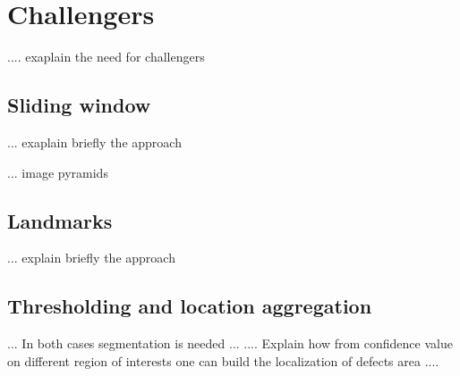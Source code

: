 \section{Challengers}\label{section:challengers}
    \par{
        .... exaplain the need for challengers
    }
    \subsection{Sliding window}
        \par{
            ... exaplain briefly the approach
        }
        \par{
            ... image pyramids
        }

    \subsection{Landmarks}
        \par{
            ... explain briefly the approach
        }

    \subsection{Thresholding and location aggregation}
        \par{
            ... In both cases segmentation is needed ...
            .... Explain how from confidence value on different region of interests one can build the localization of defects area ....
        }